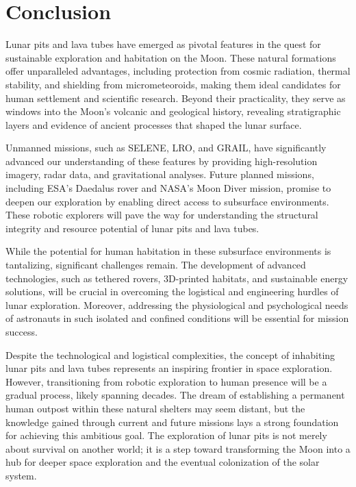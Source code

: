 \section{Conclusion}

Lunar pits and lava tubes have emerged as pivotal features in the quest for sustainable exploration and habitation on the Moon. These natural formations offer unparalleled advantages, including protection from cosmic radiation, thermal stability, and shielding from micrometeoroids, making them ideal candidates for human settlement and scientific research. Beyond their practicality, they serve as windows into the Moon’s volcanic and geological history, revealing stratigraphic layers and evidence of ancient processes that shaped the lunar surface.

Unmanned missions, such as SELENE, LRO, and GRAIL, have significantly advanced our understanding of these features by providing high-resolution imagery, radar data, and gravitational analyses. Future planned missions, including ESA's Daedalus rover and NASA's Moon Diver mission, promise to deepen our exploration by enabling direct access to subsurface environments. These robotic explorers will pave the way for understanding the structural integrity and resource potential of lunar pits and lava tubes.

While the potential for human habitation in these subsurface environments is tantalizing, significant challenges remain. The development of advanced technologies, such as tethered rovers, 3D-printed habitats, and sustainable energy solutions, will be crucial in overcoming the logistical and engineering hurdles of lunar exploration. Moreover, addressing the physiological and psychological needs of astronauts in such isolated and confined conditions will be essential for mission success.

Despite the technological and logistical complexities, the concept of inhabiting lunar pits and lava tubes represents an inspiring frontier in space exploration. However, transitioning from robotic exploration to human presence will be a gradual process, likely spanning decades. The dream of establishing a permanent human outpost within these natural shelters may seem distant, but the knowledge gained through current and future missions lays a strong foundation for achieving this ambitious goal. The exploration of lunar pits is not merely about survival on another world; it is a step toward transforming the Moon into a hub for deeper space exploration and the eventual colonization of the solar system.